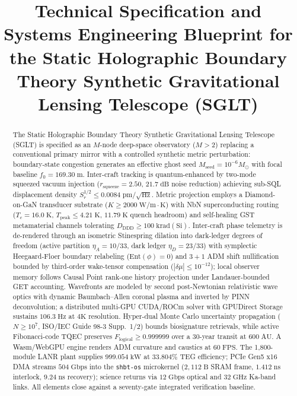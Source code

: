 \documentclass[10pt,twocolumn]{IEEEtran}
\title{Technical Specification and Systems Engineering Blueprint for the Static Holographic Boundary Theory Synthetic Gravitational Lensing Telescope (SGLT)}
\author{}
\newcommand{\Msun}{M_{\odot}}
\newcommand{\shbtos}{\texttt{shbt-os}}
\begin{document}
\maketitle

\begin{abstract}
The Static Holographic Boundary Theory Synthetic Gravitational Lensing Telescope (SGLT) is specified as an $M$-node deep-space observatory ($M>2$) replacing a conventional primary mirror with a controlled synthetic metric perturbation: boundary-state congestion generates an effective ghost seed $M_{\mathrm{seed}}=10^{-6}\Msun$ with focal baseline $f_0=169.30\;\mathrm{m}$. Inter-craft tracking is quantum-enhanced by two-mode squeezed vacuum injection ($r_{\mathrm{squeeze}}=2.50$, $21.7\;\mathrm{dB}$ noise reduction) achieving sub-SQL displacement density $S_r^{1/2}\leq0.0084\;\mathrm{pm}/\sqrt{\mathrm{Hz}}$. Metric projection employs a Diamond-on-GaN transducer substrate ($K\geq2000\;\mathrm{W/m\cdot K}$) with NbN superconducting routing ($T_c=16.0\;\mathrm{K}$, $T_{\mathrm{peak}}\leq4.21\;\mathrm{K}$, $11.79\;\mathrm{K}$ quench headroom) and self-healing GST metamaterial channels tolerating $D_{\mathrm{DDD}}\geq100\;\mathrm{krad(Si)}$. Inter-craft phase telemetry is de-rendered through an isometric Stinespring dilation into dark-ledger degrees of freedom (active partition $\eta_A=10/33$, dark ledger $\eta_D=23/33$) with symplectic Heegaard-Floer boundary relabeling ($\mathrm{Ent}(\phi)=0$) and $3{+}1$ ADM shift nullification bounded by third-order wake-tensor compensation ($|\delta\mu|\leq10^{-12}$); local observer memory follows Causal Point rank-one history projection under Landauer-bounded GET accounting. Wavefronts are modeled by second post-Newtonian relativistic wave optics with dynamic Baumbach--Allen coronal plasma and inverted by PINN deconvolution; a distributed multi-GPU CUDA/ROCm solver with GPUDirect Storage sustains $106.3\;\mathrm{Hz}$ at $4\mathrm{K}$ resolution. Hyper-dual Monte Carlo uncertainty propagation ($N\geq10^{7}$, ISO/IEC Guide 98-3 Supp.~1/2) bounds biosignature retrievals, while active Fibonacci-code TQEC preserves $F_{\mathrm{logical}}\geq0.999999$ over a 30-year transit at $600\;\mathrm{AU}$. A Wasm/WebGPU engine renders ADM curvature and caustics at $60\;\mathrm{FPS}$. The 1,800-module LANR plant supplies $999.054\;\mathrm{kW}$ at $33.804\%$ TEG efficiency; PCIe Gen5 x16 DMA streams $504\;\mathrm{Gbps}$ into the \shbtos{} microkernel ($2{,}112\;\mathrm{B}$ SRAM frame, $1.412\;\mathrm{ns}$ interlock, $9.24\;\mathrm{ns}$ recovery); science returns via $12\;\mathrm{Gbps}$ optical and $32\;\mathrm{GHz}$ Ka-band links. All elements close against a seventy-gate integrated verification baseline.
\end{abstract}
\end{document}
